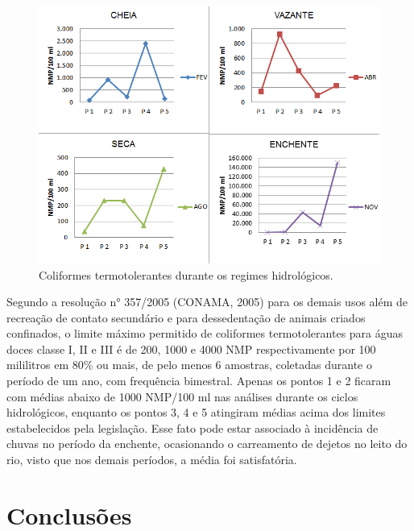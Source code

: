 \documentclass[article,12pt,onesidea,4paper,english,brazil]{abntex2}
\begin{document}
\begin{figure}[!h]
	\centering
	\includegraphics[width=0.8\linewidth]{pip-137-10}
	\caption{Coliformes termotolerantes durante os regimes hidrológicos.}
\end{figure}

Segundo a resolução n° 357/2005 (CONAMA, 2005) para os demais usos além de recreação de contato secundário e para dessedentação de animais criados confinados, o limite máximo permitido de coliformes termotolerantes para águas doces classe I, II e III é de 200, 1000 e 4000 NMP respectivamente por 100 mililitros em 80\% ou mais, de pelo menos 6 amostras, coletadas durante o período de um ano, com frequência bimestral. Apenas os pontos 1 e 2 ficaram com médias abaixo de 1000 NMP/100 ml nas análises durante os ciclos hidrológicos, enquanto os pontos 3, 4 e 5 atingiram médias acima dos limites estabelecidos pela legislação. Esse fato pode estar associado à incidência de chuvas no período da enchente, ocasionando o carreamento de dejetos no leito do rio, visto que nos demais períodos, a média foi satisfatória.

	\section*{Conclusões}
	
\end{document}
